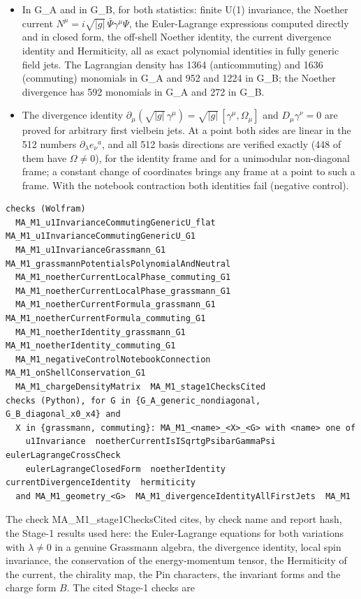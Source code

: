 \documentclass[11pt]{article}
\begin{document}
\begin{itemize}
\item In G\_A and in G\_B, for both statistics: finite U(1) invariance, the Noether current $N^\mu=i\sqrt{|g|}\,\bar\Psi\gamma^\mu\Psi$, the Euler-Lagrange expressions computed directly and in closed form, the off-shell Noether identity, the current divergence identity and Hermiticity, all as exact polynomial identities in fully generic field jets. The Lagrangian density has 1364 (anticommuting) and 1636 (commuting) monomials in G\_A and 952 and 1224 in G\_B; the Noether divergence has 592 monomials in G\_A and 272 in G\_B.
\item The divergence identity $\partial_\mu(\sqrt{|g|}\,\gamma^\mu)=\sqrt{|g|}\,[\gamma^\mu,\Omega_\mu]$ and $D_\mu\gamma^\nu=0$ are proved for arbitrary first vielbein jets. At a point both sides are linear in the 512 numbers $\partial_\lambda e_\nu{}^a$, and all 512 basis directions are verified exactly (448 of them have $\Omega\ne0$), for the identity frame and for a unimodular non-diagonal frame; a constant change of coordinates brings any frame at a point to such a frame. With the notebook contraction both identities fail (negative control).
\end{itemize}

\begin{Verbatim}[fontsize=\small]
checks (Wolfram)
  MA_M1_u1InvarianceCommutingGenericU_flat  MA_M1_u1InvarianceCommutingGenericU_G1
  MA_M1_u1InvarianceGrassmann_G1  MA_M1_grassmannPotentialsPolynomialAndNeutral
  MA_M1_noetherCurrentLocalPhase_commuting_G1
  MA_M1_noetherCurrentLocalPhase_grassmann_G1
  MA_M1_noetherCurrentFormula_grassmann_G1  MA_M1_noetherCurrentFormula_commuting_G1
  MA_M1_noetherIdentity_grassmann_G1  MA_M1_noetherIdentity_commuting_G1
  MA_M1_negativeControlNotebookConnection  MA_M1_onShellConservation_G1
  MA_M1_chargeDensityMatrix  MA_M1_stage1ChecksCited
checks (Python), for G in {G_A_generic_nondiagonal, G_B_diagonal_x0_x4} and
  X in {grassmann, commuting}: MA_M1_<name>_<X>_<G> with <name> one of
    u1Invariance  noetherCurrentIsISqrtgPsibarGammaPsi  eulerLagrangeCrossCheck
    eulerLagrangeClosedForm  noetherIdentity  currentDivergenceIdentity  hermiticity
  and MA_M1_geometry_<G>  MA_M1_divergenceIdentityAllFirstJets  MA_M1
\end{Verbatim}

The check MA\_M1\_stage1ChecksCited cites, by check name and report hash, the Stage-1 results used here: the Euler-Lagrange equations for both variations with $\lambda\ne0$ in a genuine Grassmann algebra, the divergence identity, local spin invariance, the conservation of the energy-momentum tensor, the Hermiticity of the current, the chirality map, the Pin characters, the invariant forms and the charge form $B$. The cited Stage-1 checks are
\end{document}
